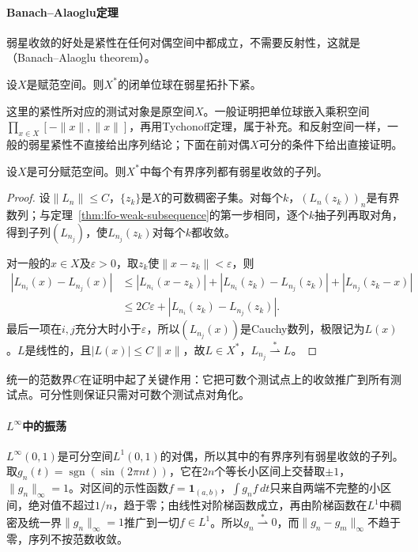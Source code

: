 \paragraph{Banach--Alaoglu定理}
弱星收敛的好处是紧性在任何对偶空间中都成立，不需要反射性，这就是（Banach--Alaoglu theorem）。

\begin{theorem}
\label{thm:lfo-banach-alaoglu}
设$X$是赋范空间。则$X^*$的闭单位球在弱星拓扑下紧。
\end{theorem}

这里的紧性所对应的测试对象是原空间$X$。一般证明把单位球嵌入乘积空间$\prod_{x\in X}[-\|x\|,\|x\|]$，再用Tychonoff定理，属于补充。和反射空间一样，一般的弱星紧性不直接给出序列结论；下面在前对偶$X$可分的条件下给出直接证明。

\begin{theorem}[可分前对偶下的弱星子列]
\label{thm:lfo-weak-star-sequential}
设$X$是可分赋范空间。则$X^*$中每个有界序列都有弱星收敛的子列。
\end{theorem}

\begin{proof}
设$\|L_n\|\leq C$，$\{z_k\}$是$X$的可数稠密子集。对每个$k$，$(L_n(z_k))_n$是有界数列；与定理~\ref{thm:lfo-weak-subsequence}的第一步相同，逐个$k$抽子列再取对角，得到子列$(L_{n_j})$，使$L_{n_j}(z_k)$对每个$k$都收敛。

对一般的$x\in X$及$\varepsilon>0$，取$z_k$使$\|x-z_k\|<\varepsilon$，则
\[
 \begin{aligned}
 |L_{n_i}(x)-L_{n_j}(x)|
 &\leq|L_{n_i}(x-z_k)|+|L_{n_i}(z_k)-L_{n_j}(z_k)|+|L_{n_j}(z_k-x)|\\
 &\leq2C\varepsilon+|L_{n_i}(z_k)-L_{n_j}(z_k)| .
 \end{aligned}
\]
最后一项在$i,j$充分大时小于$\varepsilon$，所以$(L_{n_j}(x))$是Cauchy数列，极限记为$L(x)$。$L$是线性的，且$|L(x)|\leq C\|x\|$，故$L\in X^*$，$L_{n_j}\overset{*}{\rightharpoonup}L$。
\end{proof}

统一的范数界$C$在证明中起了关键作用：它把可数个测试点上的收敛推广到所有测试点。可分性则保证只需对可数个测试点对角化。

\paragraph{$L^\infty$中的振荡}
$L^\infty(0,1)$是可分空间$L^1(0,1)$的对偶，所以其中的有界序列有弱星收敛的子列。取$g_n(t)=\operatorname{sgn}(\sin(2\pi nt))$，它在$2n$个等长小区间上交替取$\pm1$，$\|g_n\|_\infty=1$。对区间的示性函数$f=\mathbf 1_{(a,b)}$，$\int g_nf\,dt$只来自两端不完整的小区间，绝对值不超过$1/n$，趋于零；由线性对阶梯函数成立，再由阶梯函数在$L^1$中稠密及统一界$\|g_n\|_\infty=1$推广到一切$f\in L^1$。所以$g_n\overset{*}{\rightharpoonup}0$，而$\|g_n-g_m\|_\infty$不趋于零，序列不按范数收敛。

